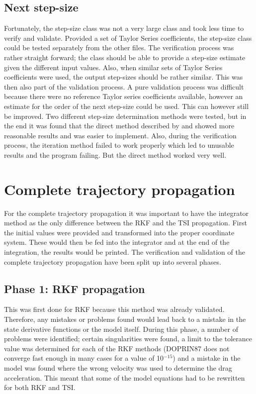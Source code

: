 \subsection{Next step-size}
\label{subsec:nextStepSizeverval}
Fortunately, the step-size class was not a very large class and took less time to verify and validate. Provided a set of Taylor Series coefficients, the step-size class could be tested separately from the other files. The verification process was rather straight forward; the class should be able to provide a step-size estimate given the different input values. Also, when similar sets of Taylor Series coefficients were used, the output step-sizes should be rather similar. This was then also part of the validation process. A pure validation process was difficult because there were no reference Taylor series coefficients available, however an estimate for the order of the next step-size could be used. This can however still be improved. Two different step-size determination methods were tested, but in the end it was found that the direct method described by \cite{scott2008high} and \cite{bergsma2015application} showed more reasonable results and was easier to implement. Also, during the verification process, the iteration method failed to work properly which led to unusable results and the program failing. But the direct method worked very well.




\section{Complete trajectory propagation}
\label{sec:propverval}
For the complete trajectory propagation it was important to have the integrator method as the only difference between the \ac{RKF} and the \ac{TSI} propagation. First the initial values were provided and transformed into the proper coordinate system. These would then be fed into the integrator and at the end of the integration, the results would be printed. The verification and validation of the complete trajectory propagation have been split up into several phases.


\subsection{Phase 1: \ac{RKF} propagation}
\label{subsec:phase1com}
This was first done for \ac{RKF} because this method was already validated. Therefore, any mistakes or problems found would lead back to a mistake in the state derivative functions or the model itself.
During this phase, a number of problems were identified; certain singularities were found, a limit to the tolerance value was determined for each of the \ac{RKF} methods (\ac{DOPRIN87} does not converge fast enough in many cases for a value of 10$^{-15}$) and a mistake in the model was found where the wrong velocity was used to determine the drag acceleration. This meant that some of the model equations had to be rewritten for both \ac{RKF} and \ac{TSI}. 

